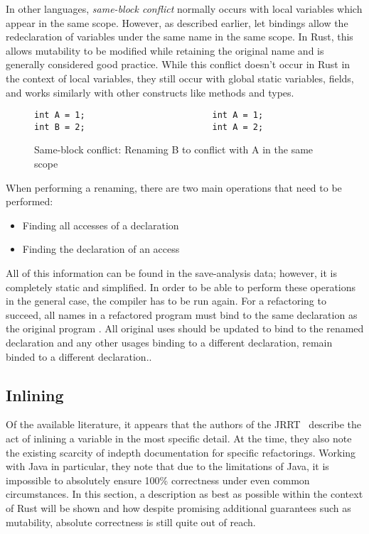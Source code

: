 In other languages, \textit{same-block conflict} normally occurs with local variables which appear in the same scope. However, as described earlier, let bindings allow the redeclaration of variables under the same name in the same scope. In Rust, this allows mutability to be modified while retaining the original name and is generally considered good practice. While this conflict doesn't occur in Rust in the context of local variables, they still occur with global static variables, fields, and works similarly with other constructs like methods and types.

\begin{figure}[h]
\begin{verbatim}
int A = 1;                         int A = 1;
int B = 2;                         int A = 2;
\end{verbatim}
\caption{Same-block conflict: Renaming B to conflict with A in the same scope}
\label{Fig:same}
\end{figure}

When performing a renaming, there are two main operations that need to be performed:
\begin{itemize}
\item Finding all accesses of a declaration
\item Finding the declaration of an access
\end{itemize}

All of this information can be found in the save-analysis data; however, it is completely static and simplified. In order to be able to perform these operations in the general case, the compiler has to be run again. For a refactoring to succeed, all names in a refactored program must bind to the same declaration as the original program \cite{schafer2010specification}. All original uses should be updated to bind to the renamed declaration and any other usages binding to a different declaration, remain binded to a different declaration..

\subsection{Inlining}

Of the available literature, it appears that the authors of the JRRT~\cite{schafer2010specification} describe the act of inlining a variable in the most specific detail. At the time, they also note the existing scarcity of indepth documentation for specific refactorings. Working with Java in particular, they note that due to the limitations of Java, it is impossible to absolutely ensure 100\% correctness under even common circumstances. In this section, a description as best as possible within the context of Rust will be shown and how despite promising additional guarantees such as mutability, absolute correctness is still quite out of reach.

